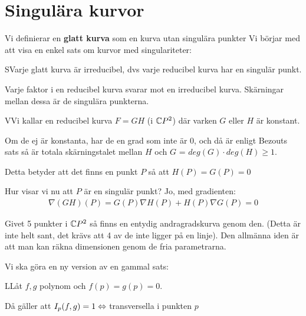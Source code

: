 \section{Singulära kurvor}\par
\noindent Vi definierar en \textbf{glatt kurva} som en kurva utan singulära punkter 
\noindent Vi börjar med att visa en enkel sats om kurvor med singulariteter:
\par\bigskip
\begin{theo}
  SVarje glatt kurva är irreducibel, dvs varje reducibel kurva har en singulär punkt.
\end{theo}
\par\bigskip
\noindent Varje faktor i en reducibel kurva svarar mot en irreducibel kurva. Skärningar mellan dessa är de singulära punkterna.
\par\bigskip
\begin{prf}
  VVi kallar en reducibel kurva $F=GH$ (i $\mathbb{C} P^2$) där varken $G$ eller $H$ är konstant.\par
  \noindent Om de ej är konstanta, har de en grad som inte är 0, och då är enligt Bezouts sats så är totala skärningstalet mellan $H$ och $G$ = $deg(G)\cdot deg(H)\geq1$.\par
  \noindent Detta betyder att det finns en punkt $P$ så att $H(P)=G(P)=0$\par
  \noindent Hur visar vi nu att $P$ är en singulär punkt? Jo, med gradienten:
  \begin{equation*}
    \begin{gathered}
      \nabla(GH)(P) = G(P)\nabla H(P)+H(P)\nabla G(P) = 0
    \end{gathered}
  \end{equation*}
\end{prf}
\par\bigskip
\noindent Givet 5 punkter i $\mathbb{C} P^2$ så finns en entydig andragradskurva genom den. (Detta är inte helt sant, det krävs att 4 av de inte ligger på en linje). Den allmänna iden är att man kan räkna dimensionen genom de fria parametrarna.
\par\bigskip
\noindent Vi ska göra en ny version av en gammal sats:
\par\bigskip
\begin{theo}
  LLåt $f,g$ polynom och $f(p)=g(p)=0$.\par
  \noindent Då gäller att $I_p(f,g) = 1\Leftrightarrow$ transversella i punkten $p$ 
\end{theo}
\newpage
